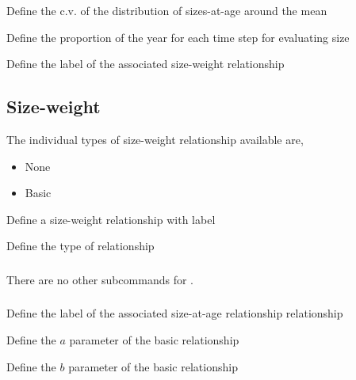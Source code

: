  {Define the c.v. of the distribution of sizes-at-age around the mean}

 {Define the proportion of the year for each time step for evaluating size}

 {Define the label of the associated size-weight relationship}

\subsection{Size-weight}

The individual types of size-weight relationship available are, 

\begin{itemize}
	\item None
	\item Basic
\end{itemize}

 {Define a size-weight relationship with label}

 {Define the type of relationship}

\subsubsection[None]{}

There are no other subcommands for .

\subsubsection[Basic]{}

 {Define the label of the associated size-at-age relationship relationship}

 {Define the $a$ parameter of the basic relationship}

 {Define the $b$ parameter of the basic relationship}

